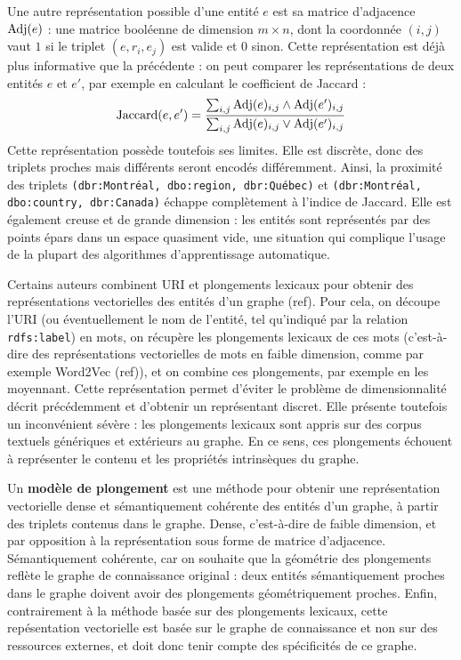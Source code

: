 Une autre représentation possible d'une entité $e$ est sa matrice d'adjacence $\operatorname{Adj}(e)$ : une matrice booléenne de dimension $m \times n$, dont la coordonnée $(i, j)$ vaut $1$ si le triplet $(e, r_i, e_j)$ est valide et $0$ sinon. Cette représentation est déjà plus informative que la précédente : on peut comparer les représentations de deux entités $e$ et $e'$, par exemple en calculant le coefficient de Jaccard :
\begin{equation}
    \operatorname{Jaccard}(e, e') = \frac{\sum_{i, j} \operatorname{Adj}(e)_{i, j} \land \operatorname{Adj}(e')_{i, j}}{\sum_{i, j} \operatorname{Adj}(e)_{i, j} \lor \operatorname{Adj}(e')_{i, j}}    
\end{equation}
Cette représentation possède toutefois ses limites. Elle est discrète, donc des triplets proches mais différents seront encodés différemment. Ainsi, la proximité des triplets \texttt{(dbr:Montréal, dbo:region, dbr:Québec)} et \texttt{(dbr:Montréal, dbo:country, dbr:Canada)} échappe complètement à l'indice de Jaccard. Elle est également creuse et de grande dimension : les entités sont représentés par des points épars dans un espace quasiment vide, une situation qui complique l'usage de la plupart des algorithmes d'apprentissage automatique.


Certains auteurs combinent URI et plongements lexicaux pour obtenir des représentations vectorielles des entités d'un graphe (ref). Pour cela, on découpe l'URI (ou éventuellement le nom de l'entité, tel qu'indiqué par la relation \texttt{rdfs:label}) en mots, on récupère les plongements lexicaux de ces mots (c'est-à-dire des représentations vectorielles de mots en faible dimension, comme par exemple Word2Vec (ref)), et on combine ces plongements, par exemple en les moyennant. Cette représentation permet d'éviter le problème de dimensionnalité décrit précédemment et d'obtenir un représentant discret. Elle présente toutefois un inconvénient sévère : les plongements lexicaux sont appris sur des corpus textuels génériques et extérieurs au graphe. En ce sens, ces plongements échouent à représenter le contenu et les propriétés intrinsèques du graphe. %


Un \textbf{modèle de plongement} est une méthode pour obtenir une représentation vectorielle dense et sémantiquement cohérente des entités d'un graphe, à partir des triplets contenus dans le graphe. Dense, c'est-à-dire de faible dimension, et par opposition à la représentation sous forme de matrice d'adjacence. Sémantiquement cohérente, car on souhaite que la géométrie des plongements reflète le graphe de connaissance original : deux entités sémantiquement proches dans le graphe doivent avoir des plongements géométriquement proches. Enfin, contrairement à la méthode basée sur des plongements lexicaux, cette repésentation vectorielle est basée sur le graphe de connaissance et non sur des ressources externes, et doit donc tenir compte des spécificités de ce graphe.

